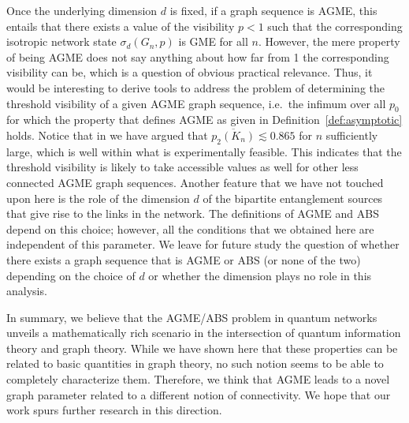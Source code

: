 \documentclass[a4paper,onecolumn,accepted=2024-12-14]{quantumarticle}
\theoremstyle{plain}
\begin{document}
Once the underlying dimension $d$ is fixed, if a graph sequence is AGME, this entails that there exists a value of the visibility $p<1$ such that the corresponding isotropic network state $\sigma_d(G_n,p)$ is GME for all $n$. However, the mere property of being AGME does not say anything about how far from 1 the corresponding visibility can be, which is a question of obvious practical relevance. Thus, it would be interesting to derive tools to address the problem of determining the threshold visibility of a given AGME graph sequence, i.e.\ the infimum over all $p_0$ for which the property that defines AGME as given in Definition~\ref{def:asymptotic} holds. Notice that in \cite{ASGME} we have argued that $\overline{p_2(K_n)}\lesssim0.865$ for $n$ sufficiently large, which is well within what is experimentally feasible. This indicates that the threshold visibility is likely to take accessible values as well for other less connected AGME graph sequences. Another feature that we have not touched upon here is the role of the dimension $d$ of the bipartite entanglement sources that give rise to the links in the network. The definitions of AGME and ABS depend on this choice; however, all the conditions that we obtained here are independent of this parameter. We leave for future study the question of whether there exists a graph sequence that is AGME or ABS (or none of the two) depending on the choice of $d$ or whether the dimension plays no role in this analysis.

In summary, we believe that the AGME/ABS problem in quantum networks unveils a mathematically rich scenario in the intersection of quantum information theory and graph theory. While we have shown here that these properties can be related to basic quantities in graph theory, no such notion seems to be able to completely characterize them. Therefore, we think that AGME leads to a novel graph parameter related to a different notion of connectivity. We hope that our work spurs further research in this direction.
\end{document}
